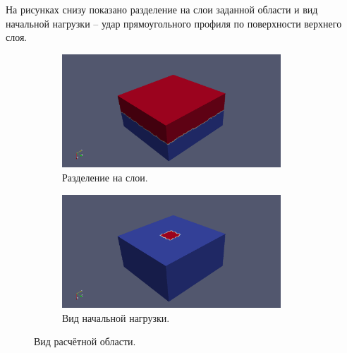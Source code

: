 	На рисунках снизу показано разделение на слои заданной области и вид начальной нагрузки -- удар прямоугольного профиля по поверхности верхнего слоя.	
\begin{figure}[H]
\begin{subfigure}[b]{0.5\textwidth}
\centering
\includegraphics[width=0.9\textwidth]{png/two-layers/view.png}
\caption{Разделение на слои.}
\end{subfigure}
\begin{subfigure}[b]{0.5\textwidth}
\centering
\includegraphics[width=0.9\textwidth]{png/two-layers/initial_view.png}
\caption{Вид начальной нагрузки.}
\end{subfigure}
\caption{Вид расчётной области.}
\label{pic:two_layers_view}
\end{figure}

